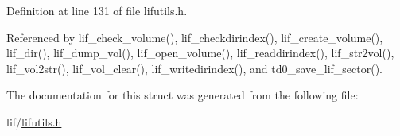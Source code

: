 Definition at line 131 of file lifutils.\+h.



Referenced by lif\+\_\+check\+\_\+volume(), lif\+\_\+checkdirindex(), lif\+\_\+create\+\_\+volume(), lif\+\_\+dir(), lif\+\_\+dump\+\_\+vol(), lif\+\_\+open\+\_\+volume(), lif\+\_\+readdirindex(), lif\+\_\+str2vol(), lif\+\_\+vol2str(), lif\+\_\+vol\+\_\+clear(), lif\+\_\+writedirindex(), and td0\+\_\+save\+\_\+lif\+\_\+sector().



The documentation for this struct was generated from the following file\+:\begin{DoxyCompactItemize}
\item 
lif/\hyperlink{lifutils_8h}{lifutils.\+h}\end{DoxyCompactItemize}
